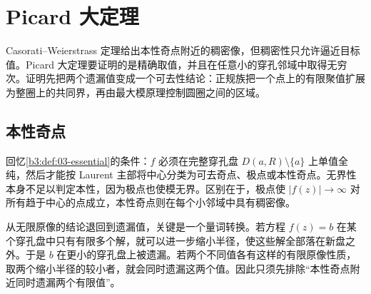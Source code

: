 \section{Picard 大定理}
\label{b3:sec:1405}

Casorati--Weierstrass 定理给出本性奇点附近的稠密像，但稠密性只允许逼近目标值。Picard 大定理要证明的是精确取值，并且在任意小的穿孔邻域中取得无穷次。证明先把两个遗漏值变成一个可去性结论：正规族把一个点上的有限聚值扩展为整圈上的共同界，再由最大模原理控制圆圈之间的区域。

\subsection{本性奇点}
\label{b3:subsec:140501}

回忆\cref{b3:def:03-essential}的条件：\(f\) 必须在完整穿孔盘 \(D(a,R)\setminus\{a\}\) 上单值全纯，然后才能按 Laurent 主部将中心分类为可去奇点、极点或本性奇点。无界性本身不足以判定本性，因为极点也使模无界。区别在于，极点使 \(|f(z)|\to\infty\) 对所有趋于中心的点成立，本性奇点则在每个小邻域中具有稠密像。

\ProseParagraphBreak
从无限原像的结论退回到遗漏值，关键是一个量词转换。若方程 \(f(z)=b\) 在某个穿孔盘中只有有限多个解，就可以进一步缩小半径，使这些解全部落在新盘之外。于是 \(b\) 在更小的穿孔盘上被遗漏。若两个不同值各有这样的有限原像性质，取两个缩小半径的较小者，就会同时遗漏这两个值。因此只须先排除“本性奇点附近同时遗漏两个有限值”。

